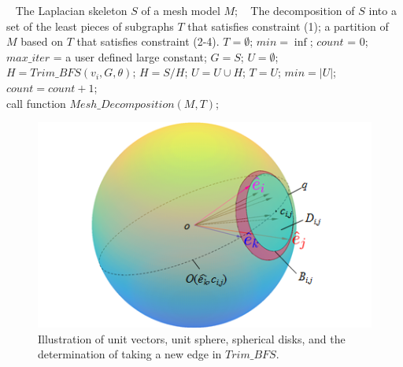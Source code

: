 \begin{algorithm}
\caption{$SkeletonMeshDecomposition(S, M)$}
\label{alg:Framwork}
\begin{algorithmic}[1]
\REQUIRE~
The Laplacian skeleton $S$ of a mesh model $M$;
\ENSURE~
The decomposition of $S$ into a set of the least pieces of subgraphs $T$ that satisfies constraint (1); a partition of $M$ based on $T$ that satisfies constraint (2-4).
\STATE $T = \emptyset$; $min = \inf$; $count$ = 0; $max\_iter$ = a user defined large constant;
\STATE  $G=S$; $U= \emptyset$;
\STATE $H = Trim\_BFS(v_i, G, \theta)$;
\STATE $H = S / H$;
\STATE $U = U \cup H$;
\STATE $T = U$;
\STATE  $min = | U | $;
\ENDIF
\ENDFOR
\ENDWHILE
\STATE $count =count + 1$;
\ENDWHILE
\label{code:fram:select} \\
\STATE call function $Mesh\_Decomposition(M, T)$;
\end{algorithmic}
\end{algorithm}







\begin{figure}[tbp]
  \centering
  \includegraphics[width=\linewidth]{figs/take_arc.png}
  \caption{\label{fig:sphere}%
           Illustration of unit vectors, unit sphere, spherical disks, and the determination of taking a new edge in $Trim\_BFS$.}
\end{figure}

